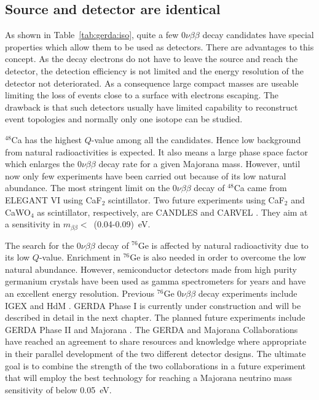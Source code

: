 \subsection{Source and detector are identical}
\label{sec:exp:sed}
As shown in Table~\ref{tab:gerda:iso}, quite a few $0\nu\beta\beta$
decay candidates have special properties which allow them to be used
as detectors. There are advantages to this concept. As the decay
electrons do not have to leave the source and reach the detector, the
detection efficiency is not limited and the energy resolution of the
detector not deteriorated. As a consequence large compact masses are
useable limiting the loss of events close to a surface with electrons
escaping. The drawback is that such detectors usually have limited
capability to reconstruct event topologies and normally only one
isotope can be studied.

$^{48}$Ca has the highest $Q$-value among all the candidates. Hence
low background from natural radioactivities is expected. It also means
a large phase space factor which enlarges the $0\nu\beta\beta$ decay
rate for a given Majorana mass. However, until now only few
experiments have been carried out because of its low natural
abundance. The most stringent limit on the $0\nu\beta\beta$ decay of
$^{48}$Ca came from ELEGANT VI \cite{Oga04} using CaF$_{2}$
scintillator. Two future experiments using CaF$_{2}$ and CaWO$_{4}$ as
scintillator, respectively, are CANDLES \cite{Hir08} and
CARVEL \cite{Zde05}. They aim at a sensitivity in $m_{\beta\beta}
<$~(0.04-0.09)~eV.

The search for the $0\nu\beta\beta$ decay of $^{76}$Ge is affected by
natural radioactivity due to its low $Q$-value. Enrichment in
$^{76}$Ge is also needed in order to overcome the low natural
abundance. However, semiconductor detectors made from high purity
germanium crystals have been used as gamma spectrometers for years and
have an excellent energy resolution. Previous $^{76}$Ge
$0\nu\beta\beta$ decay experiments include IGEX \cite{Aal02} and
HdM \cite{Hei04}. GERDA \cite{Sch05} Phase I is currently under
construction and will be described in detail in the next chapter. The
planned future experiments include GERDA Phase II and
Majorana \cite{Gai03, Aal04}. The GERDA and Majorana Collaborations
have reached an agreement to share resources and knowledge where
appropriate in their parallel development of the two different
detector designs. The ultimate goal is to combine the strength of the
two collaborations in a future experiment that will employ the best
technology for reaching a Majorana neutrino mass sensitivity of below
0.05~eV.

